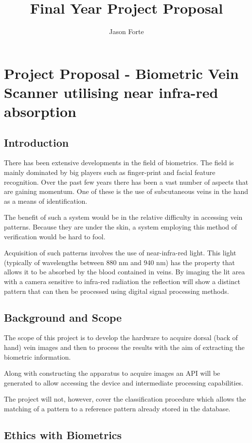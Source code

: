 \documentclass[10pt,a4paper,twoside,noindent]{report}
\author{Jason Forte}
\title{Final Year Project Proposal}
\begin{document}
\thispagestyle{empty}
\section*{Project Proposal - Biometric Vein Scanner utilising near infra-red absorption}
\subsection*{Introduction}

There has been extensive developments in the field of biometrics. The field is mainly dominated by big players such as finger-print and facial feature recognition. Over the past few years there has been a vast number of aspects that are gaining momentum. One of these is the use of subcutaneous veins in the hand as a means of identification.

The benefit of such a system would be in the relative difficulty in accessing vein patterns. Because they are under the skin, a system employing this method of verification would be hard to fool.

Acquisition of such patterns involves the use of near-infra-red light. This light (typically of wavelengths between 880 nm and 940 nm) has the property that allows it to be absorbed by the blood contained in veins. By imaging the lit area with a camera sensitive to infra-red radiation the reflection will show a distinct pattern that can then be processed using digital signal processing methods.

\subsection*{Background and Scope}

The scope of this project is to develop the hardware to acquire dorsal (back of hand) vein images and then to process the results with the aim of extracting the biometric information.

Along with constructing the apparatus to acquire images an API will be generated to allow accessing the device and intermediate processing capabilities.

The project will not, however, cover the classification procedure which allows the matching of a pattern to a reference pattern already stored in the database.

\subsection*{Ethics with Biometrics}
\end{document}

